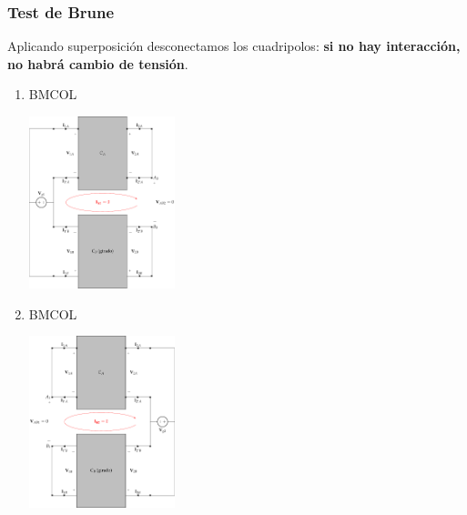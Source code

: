 \subsubsection{Test de Brune}
\label{sec:org2591d22}
Aplicando superposición desconectamos los cuadripolos: \textbf{si no hay interacción, no habrá cambio de tensión}.
\begin{enumerate}
\item \hfill{}\textsc{BMCOL}
\label{sec:org951e127}
\begin{center}
\includegraphics[height=5cm]{../figs/paralelo-paralelo-brune-entrada.pdf}
\end{center}
\item \hfill{}\textsc{BMCOL}
\label{sec:orgc2f98c6}
\begin{center}
\includegraphics[height=5cm]{../figs/paralelo-paralelo-brune-salida.pdf}
\end{center}
\end{enumerate}


